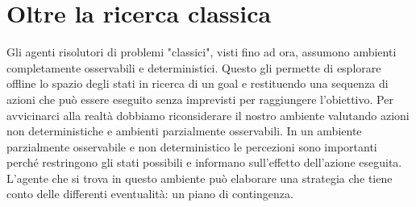 \documentclass{article}
\begin{document}
\section{Oltre la ricerca classica}
Gli agenti risolutori di problemi "classici", visti fino ad ora, assumono ambienti completamente osservabili e deterministici. Questo gli permette di esplorare offline lo spazio degli stati in ricerca di un goal e restituendo una sequenza di azioni che può essere eseguito senza imprevisti per raggiungere l'obiettivo. Per avvicinarci alla realtà dobbiamo riconsiderare il nostro ambiente valutando azioni non deterministiche e ambienti parzialmente osservabili. \newline
In un ambiente parzialmente osservabile e non deterministico le percezioni sono importanti perché restringono gli stati possibili e informano sull'effetto dell'azione eseguita. L'agente che si trova in questo ambiente può elaborare una strategia che tiene conto delle differenti eventualità: un piano di contingenza.
\end{document}
